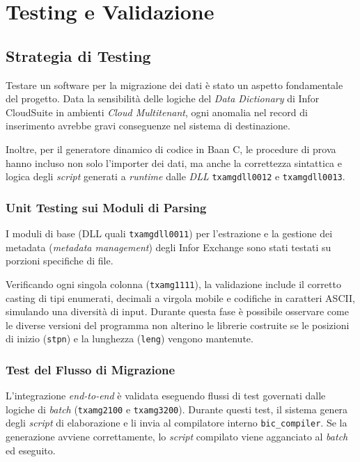 \chapter{Testing e Validazione}\label{ch:testing-e-validazione}

\section{Strategia di Testing}\label{sec:strategia-di-testing}
Testare un software per la migrazione dei dati è stato un aspetto fondamentale del progetto.
Data la sensibilità delle logiche del \textit{Data Dictionary} di Infor CloudSuite in ambienti \textit{Cloud Multitenant},
ogni anomalia nel record di inserimento avrebbe gravi conseguenze nel sistema di destinazione.

Inoltre, per il generatore dinamico di codice in Baan C, le procedure di prova
hanno incluso non solo l'importer dei dati, ma anche la correttezza sintattica e logica degli \textit{script}
generati a \textit{runtime} dalle \textit{DLL} \texttt{txamgdll0012} e \texttt{txamgdll0013}.

\subsection{Unit Testing sui Moduli di Parsing}\label{subsec:unit-testing-sui-moduli-di-parsing}
I moduli di base (DLL quali \texttt{txamgdll0011}) per l'estrazione e la gestione dei metadata (\textit{metadata management})
degli Infor Exchange sono stati testati su porzioni specifiche di file.

Verificando ogni singola colonna (\texttt{txamg1111}), la validazione include il corretto casting di tipi enumerati,
decimali a virgola mobile e codifiche in caratteri ASCII, simulando una diversità di input.
Durante questa fase è possibile osservare come le diverse versioni del programma non alterino le librerie costruite
se le posizioni di inizio (\texttt{stpn}) e la lunghezza (\texttt{leng}) vengono mantenute.

\subsection{Test del Flusso di Migrazione}\label{subsec:test-del-flusso-di-migrazione}
L'integrazione \textit{end-to-end} è validata eseguendo flussi di test governati dalle logiche di \textit{batch} (\texttt{txamg2100}
e \texttt{txamg3200}).
Durante questi test, il sistema genera degli \textit{script} di elaborazione e li invia al compilatore interno \texttt{bic\_compiler}.
Se la generazione avviene correttamente, lo \textit{script} compilato viene agganciato al \textit{batch} ed eseguito.

